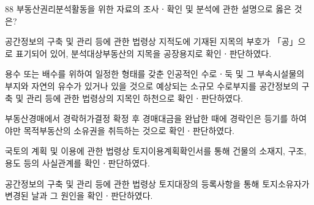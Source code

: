 \begin{question}{88}
부동산권리분석활동을 위한 자료의 조사ㆍ확인 및 분석에 관한 설명으로 옳은 것은?
\begin{choices}
  \item 공간정보의 구축 및 관리 등에 관한 법령상 지적도에 기재된 지목의 부호가 「공」으로 표기되어 있어, 분석대상부동산의 지목을 공장용지로 확인ㆍ판단하였다.
  \item 용수 또는 배수를 위하여 일정한 형태를 갖춘 인공적인 수로ㆍ둑 및 그 부속시설물의 부지와 자연의 유수가 있거나 있을 것으로 예상되는 소규모 수로부지를 공간정보의 구축 및 관리 등에 관한 법령상의 지목인 하천으로 확인ㆍ판단하였다.
  \item 부동산경매에서 경락허가결정 확정 후 경매대금을 완납한 때에 경락인은 등기를 하여야만 목적부동산의 소유권을 취득하는 것으로 확인ㆍ판단하였다.
  \item 국토의 계획 및 이용에 관한 법령상 토지이용계획확인서를 통해 건물의 소재지, 구조, 용도 등의 사실관계를 확인ㆍ판단하였다.
  \item 공간정보의 구축 및 관리 등에 관한 법령상 토지대장의 등록사항을 통해 토지소유자가 변경된 날과 그 원인을 확인ㆍ판단하였다.
\end{choices}
\end{question}
